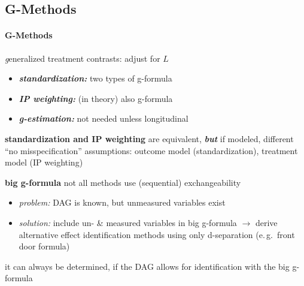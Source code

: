 \documentclass[8pt,twoside]{extarticle}
\begin{document}
\begin{multicols}{2}
{\begin{minipage}{28em}
\end{minipage}}



\end{multicols}





\subsection{G-Methods}
\begin{multicols}{2}


\paragraph{G-Methods} \textit{g}eneralized treatment contrasts:
adjust for $L$
\begin{itemize}[itemsep=0em, topsep=0pt, partopsep=0pt,parsep=0pt]
\setlength{\itemsep}{0pt}%
\setlength{\parskip}{0pt}
\item \textbf{\textit{standardization:}}  two types of g-formula
\item \textbf{\textit{IP weighting:}} (in theory) also g-formula 
\item \textbf{\textit{g-estimation:}} not needed unless longitudinal
\end{itemize}

 \textbf{standardization and IP weighting}
are equivalent, \textit{\textbf{but}} if modeled, different ``no misspecification'' assumptions: outcome model (standardization), treatment model (IP weighting)

 \textbf{big g-formula}
not all methods use (sequential) exchangeability 
\begin{itemize}[itemsep=0em, topsep=0pt, partopsep=0pt,parsep=0pt]
\item \textit{problem:} DAG is known, but unmeasured variables exist
\item \textit{solution:} include un- \& measured variables in big g-formula $\to$ derive
alternative effect identification methods using only d-separation (e.\,g.\  front door formula)
\end{itemize}
it can always be determined, if the DAG allows for identification with the big g-formula
\citep{hernan2023causal}



\end{multicols}
\end{document}
